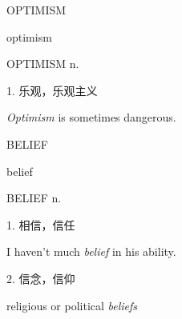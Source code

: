 \begin{flashcard}{
OPTIMISM

optimism
}
\begin{center}
OPTIMISM n. 
\end{center}
1. 乐观，乐观主义

\textit{Optimism} is sometimes dangerous.

\end{flashcard}
\begin{flashcard}{
BELIEF

belief
}
\begin{center}
BELIEF n. 
\end{center}
1. 相信，信任

I haven't much \textit{belief} in his ability.

2. 信念，信仰

religious or political \textit{beliefs}

\end{flashcard}
